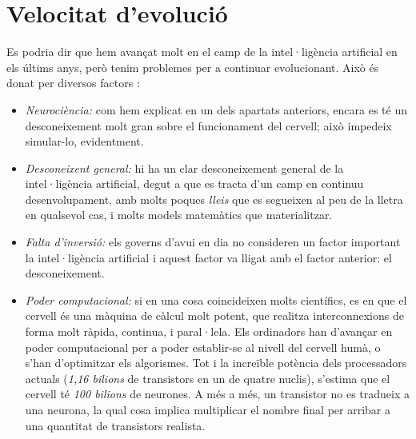 \section {Velocitat d'evolució}
Es podria dir que hem avançat molt en el camp de la intel·ligència artificial en els últims anys, però tenim problemes per a continuar evolucionant. Això és
donat per diversos factors \cite{pbs}:
\begin {itemize}
\item \emph{Neurociència:} com hem explicat en un dels apartats anteriors, encara es té un desconeixement molt gran sobre el funcionament del cervell; això impedeix simular-lo, evidentment.
\item \emph{Desconeixent general:} hi ha un clar desconeixement general de la intel·ligència artificial, degut a que es tracta d'un camp en continuu desenvolupament, amb molts poques \emph{lleis} que es segueixen al peu de la lletra en qualsevol cas, i molts models matemàtics que materialitzar.
\item \emph{Falta d'inversió:} els governs d'avui en dia no consideren un factor important la intel·ligència artificial i aquest factor va lligat amb el factor anterior: el desconeixement.
\item \emph{Poder computacional:} si en una cosa coincideixen molts científics, es en que el cervell és una màquina de càlcul molt potent, que realitza interconnexions de forma molt ràpida, continua, i paral·lela. Els ordinadors han d'avançar en poder computacional per a poder establir-se al nivell del cervell humà, o s'han d'optimitzar els algorismes. Tot i la increïble potència dels processadors actuals (\emph{1,16 bilions} de transistors en un de quatre nuclis), s'estima que el cervell té \emph{100 bilions} de neurones. A més a més, un transistor no es tradueix a una neurona, la qual cosa implica multiplicar el nombre final per arribar a una quantitat de transistors realista.
\end {itemize}

